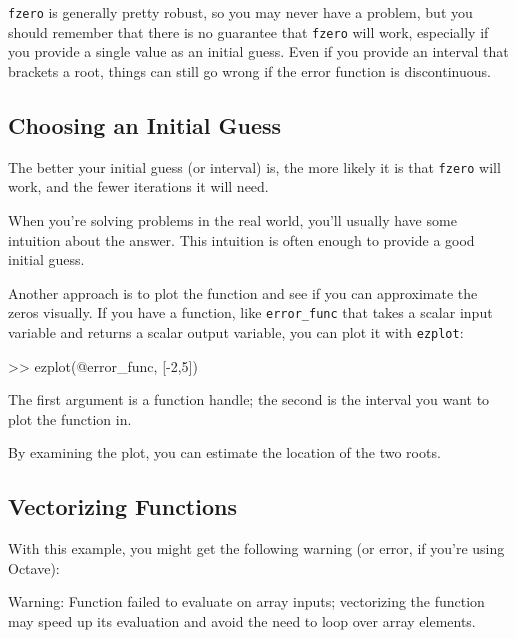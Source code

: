 {\tt fzero} is generally pretty robust, so you may never have a problem, but you should remember that there is no guarantee that {\tt fzero} will work, especially if you provide a single value as an initial guess.  Even if you provide an interval that brackets a root, things can still go wrong if the error function is discontinuous.


\subsection{Choosing an Initial Guess}

The better your initial guess (or interval) is, the more likely
it is that {\tt fzero} will work, and the fewer iterations it will
need.

When you're solving problems in the real world, you'll usually
have some intuition about the answer.  This intuition is often enough
to provide a good initial guess.


Another approach is to plot the function and see if you can
approximate the zeros visually.  If you have a function, like
{\tt error\_func} that takes a scalar input variable and returns
a scalar output variable, you can plot it with {\tt ezplot}:

\begin{code}
>> ezplot(@error_func, [-2,5])
\end{code}


The first argument is a function handle; the second is the interval you want to plot the function in.

By examining the plot, you can estimate the location of the two roots.


\subsection{Vectorizing Functions}


With this example, you might get the following warning (or error, if you're using Octave):

\begin{code}
Warning: Function failed to evaluate on array inputs;
vectorizing the function may speed up its evaluation and 
avoid the need to loop over array elements. 
\end{code}

